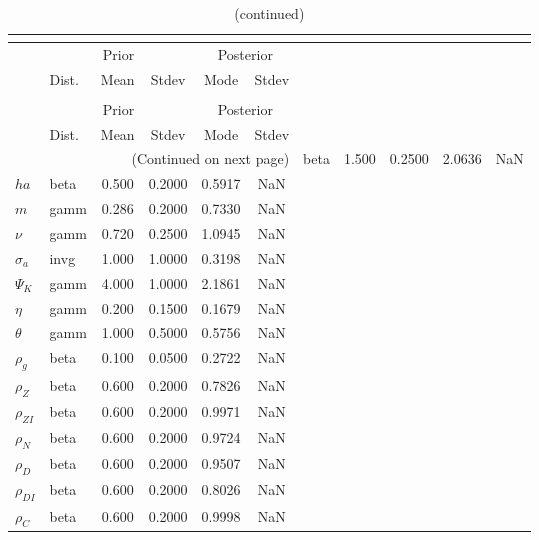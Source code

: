  
\begin{center}
\begin{longtable}{llcccc} 
\caption{Results from posterior maximization (parameters)}\\
 \label{Table:Posterior:1}\\
\toprule 
  & \multicolumn{3}{c}{Prior}  &  \multicolumn{2}{c}{Posterior} \\
  \cmidrule(r{.75em}){2-4} \cmidrule(r{.75em}){5-6}
  & Dist. & Mean  & Stdev & Mode & Stdev \\ 
\midrule \endfirsthead 
\caption{(continued)}\\
 \bottomrule 
  & \multicolumn{3}{c}{Prior}  &  \multicolumn{2}{c}{Posterior} \\
  \cmidrule(r{.75em}){2-4} \cmidrule(r{.75em}){5-6}
  & Dist. & Mean  & Stdev & Mode & Stdev \\ 
\midrule \endhead 
\bottomrule \multicolumn{6}{r}{(Continued on next page)}\endfoot 
\bottomrule\endlastfoot 
${\gamma}$ & beta &   1.500 & 0.2500 &   2.0636 &     NaN \\ 
${ha}$ & beta &   0.500 & 0.2000 &   0.5917 &     NaN \\ 
${m}$ & gamm &   0.286 & 0.2000 &   0.7330 &     NaN \\ 
$\nu$ & gamm &   0.720 & 0.2500 &   1.0945 &     NaN \\ 
${\sigma_a}$ & invg &   1.000 & 1.0000 &   0.3198 &     NaN \\ 
${\Psi_K}$ & gamm &   4.000 & 1.0000 &   2.1861 &     NaN \\ 
${\eta}$ & gamm &   0.200 & 0.1500 &   0.1679 &     NaN \\ 
${\theta}$ & gamm &   1.000 & 0.5000 &   0.5756 &     NaN \\ 
${\rho_g}$ & beta &   0.100 & 0.0500 &   0.2722 &     NaN \\ 
${\rho_Z}$ & beta &   0.600 & 0.2000 &   0.7826 &     NaN \\ 
${\rho_{ZI}}$ & beta &   0.600 & 0.2000 &   0.9971 &     NaN \\ 
${\rho_N}$ & beta &   0.600 & 0.2000 &   0.9724 &     NaN \\ 
${\rho_D}$ & beta &   0.600 & 0.2000 &   0.9507 &     NaN \\ 
${\rho_{DI}}$ & beta &   0.600 & 0.2000 &   0.8026 &     NaN \\ 
${\rho_C}$ & beta &   0.600 & 0.2000 &   0.9998 &     NaN \\ 
\end{longtable}
 \end{center}

